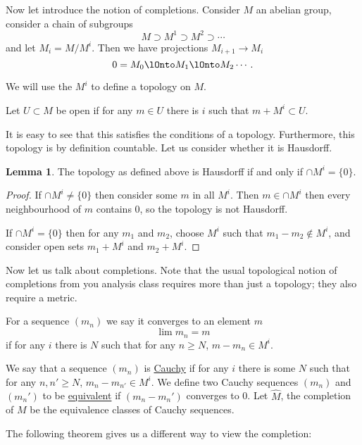 \documentclass[12 pt]{article}
\theoremstyle{definition}
\newtheorem{lemma}[theorem]{Lemma}
\begin{document}
Now let introduce the notion of completions. Consider $M$ an abelian group, consider a chain of subgroups
\[M \supset M^1 \supset M^2 \supset \cdots\]
and let $M_i=M/M^i$. Then we have projections $M_{i+1} \to M_{i}$
\[0=M_0 \lOnto M_1 \lOnto M_2 \cdots.\]

We will use the $M^i$ to define a topology on $M$.

\begin{definition} Let $U \subset M$ be open if for any $m \in U$ there is $i$ such that $m+M^i \subset U$.
\end{definition}

It is easy to see that this satisfies the conditions of a topology. Furthermore, this topology is by definition countable. Let us consider whether it is Hausdorff.

\begin{lemma} The topology as defined above is Hausdorff if and only if $\cap M^i=\{0\}$.
\end{lemma}
\begin{proof} If $\cap M^i \neq \{0\}$ then consider some $m$ in all $M^i$. Then $m \in \cap M^i$ then every neighbourhood of $m$ contains 0, so the topology is not Hausdorff.

If $\cap M^i =\{0\}$ then for any $m_1$ and $m_2$, choose $M^i$ such that $m_1-m_2 \not \in M^i$, and consider open sets $m_1 +M^i$ and $m_2+M^i$.
\end{proof}

Now let us talk about completions. Note that the usual topological notion of completions from you analysis class requires more than just a topology; they also require a metric.

\begin{definition} For a sequence $(m_n)$ we say it converges to an element $m$
\[\lim m_n=m\]
if for any $i$ there is $N$ such that for any $n \geq N$, $m-m_n \in M^i$.
\end{definition}

\begin{definition} We say that a sequence $(m_n)$ is \underline{Cauchy} if for any $i$ there is some $N$ such that for any $n, n' \geq N$, $m_n-m_{n'} \in M^i$. We define two Cauchy sequences $(m_n)$ and $(m_n')$ to be \underline{equivalent} if $(m_n-m_n')$ converges to 0. Let $\widehat{M}$, the completion of $M$ be the equivalence classes of Cauchy sequences.
\end{definition}

The following theorem gives us a different way to view the completion:
\end{document}
